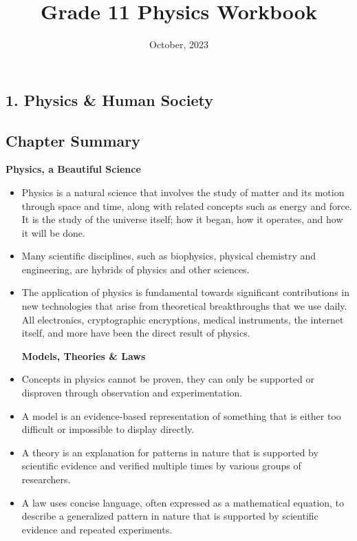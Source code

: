 \documentclass[12pt,addpoints]{exam}
\date{October, 2023}
\begin{document}
	\title{Grade 11 Physics Workbook}
	\maketitle
	
	\begin{center}
		\section*{1. Physics \& Human Society}
		\subsection*{Chapter Summary}
		\textbf{Physics, a Beautiful Science} 
	\end{center}
		
	\begin{itemize}
		\item Physics is a natural science that involves the study of matter and its motion through space and time, along with related concepts such as energy and force. It is the study of the universe itself; how it began, how it operates, and how it will be done.
		\item Many scientific disciplines, such as biophysics, physical chemistry and engineering, are hybrids of physics and other sciences.
		\item The application of physics is fundamental towards significant contributions in new technologies that arise from theoretical breakthroughs that we use daily. All electronics, cryptographic encryptions, medical instruments, the internet itself, and more have been the direct result of physics.
		\begin{center}
			\textbf{Models, Theories \& Laws} 
		\end{center}
		\item Concepts in physics cannot be proven, they can only be supported or disproven through observation and experimentation. 
		\item A model is an evidence-based representation of something that is either too difficult or impossible to display directly.
		\item A theory is an explanation for patterns in nature that is supported by scientific evidence and verified multiple times by various groups of researchers.
		\item A law uses concise language, often expressed as a mathematical equation, to describe a generalized pattern in nature that is supported by scientific evidence and repeated experiments.

\end{itemize}
\end{document}
